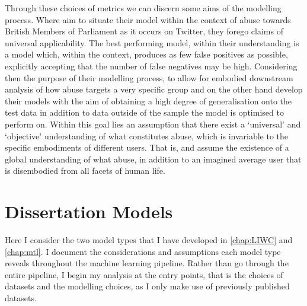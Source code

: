 Through these choices of metrics we can discern some aims of the modelling process.
Where \citet{Gorrell:2018} aim to situate their model within the context of abuse towards British Members of Parliament as it occurs on Twitter, they forego claims of universal applicability.
The best performing model, within their understanding is a model which, within the context, produces as few false positives as possible, explicitly accepting that the number of false negatives may be high.
Considering then the purpose of their modelling process,  to allow for embodied downstream analysis of how abuse targets a very specific group
\citet{Wulczyn:2016} and \citet{Kshirsagar:2018} on the other hand develop their models with the aim of obtaining a high degree of generalisation onto the test data in addition to data outside of the sample the model is optimised to perform on.
Within this goal lies an assumption that there exist a `universal' and  `objective' understanding of what constitutes abuse, which is invariable to the specific embodiments of different users. 
That is, \citet{Wulczyn:2016} and \citet{Kshirsagar:2018} assume the existence of a global understanding of what  abuse, in addition to an imagined average user that is disembodied from all facets of human life.

\section{Dissertation Models}
Here I consider the two model types that I have developed in \autoref{chap:LIWC} and \autoref{chap:mtl}.
I document the considerations and assumptions each model type reveals throughout the machine learning pipeline.
Rather than go through the entire pipeline, I begin my analysis at the entry points, that is the choices of datasets and the modelling choices, as I only make use of previously published datasets.

